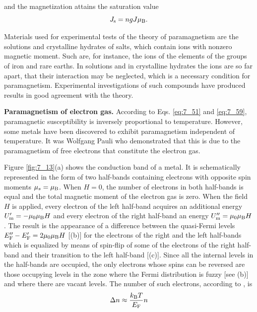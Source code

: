 \noindent
and the magnetization attains the saturation value
\begin{equation}\label{eq:7_60}
    J_{\text{s}} = n g J \mu_{\text{B}}.
\end{equation}

Materials used for experimental tests of the theory of paramagnetism are the solutions and crystalline hydrates of salts, which contain ions with nonzero magnetic moment. Such are, for instance, the ions of the elements of the groups of iron and rare earths. In solutions and in crystalline hydrates the ions are so far apart, that their interaction may be neglected, which is a necessary condition for paramagnetism. Experimental investigations of such compounds have produced results in good agreement with the theory.

\textbf{Paramagnetism of electron gas.} According to Eqs. \eqref{eq:7_51} and \eqref{eq:7_59}, paramagnetic susceptibility is inversely proportional to temperature. However, some metals have been discovered to exhibit paramagnetism independent of temperature. It was Wolfgang Pauli who demonstrated that this is due to the paramagnetism of free electrons that constitute the electron gas.

Figure \ref{fig:7_13}(a) shows the conduction band of a metal. It is schematically represented in the form of two half-bands containing electrons with opposite spin moments $\mu_s=\mu_{\text{B}}$. When $H=0$, the number of electrons in both half-bands is equal and the total magnetic moment of the electron gas is zero. When the field $H$ is applied, every electron of the left half-band acquires an additional energy $U_{\text{m}}'=-\mu_0\mu_{\text{B}}H$ and every electron of the right half-band an energy $U_{\text{m}}''=\mu_0\mu_{\text{B}}H$.
The result is the appearance of a difference between the quasi-Fermi levels $E_{\text{F}}''-E_{\text{F}}'=2\mu_0\mu_{\text{B}}H$ [(b)] for the electrons of the right and the left half-bands which is equalized by means of spin-flip of some of the electrons of the right half-band and their transition to the left half-band [(c)]. Since all the internal levels in the half-bands are occupied, the only electrons whose spins can be reversed are those occupying levels in the zone where the Fermi distribution is fuzzy [see (b)] and where there are vacant levels. The number of such electrons, according to , is
\begin{equation}\label{eq:7_61}
    \Delta{n} \approx \frac{k_{\text{B}} T}{E_{\text{F}}} n
\end{equation}

